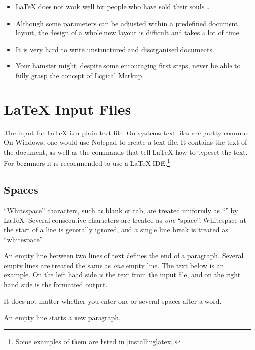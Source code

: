 \begin{itemize}
  \item \LaTeX{} does not work well for people who have sold their
        souls \ldots
  \item Although some parameters can be adjusted within a predefined
        document layout, the design of a whole new layout is difficult and
        takes a lot of time.
  \item It is very hard to write unstructured and disorganised documents.
  \item Your hamster might, despite some encouraging first steps, never be
        able to fully grasp the concept of Logical Markup.
\end{itemize}

\section{\LaTeX{} Input Files}

The input for \LaTeX{} is a plain text file. On \Unix{} systems text files are
pretty common. On Windows, one would use Notepad to create a text file. It
contains the text of the document, as well as the commands that tell \LaTeX{}
how to typeset the text. For beginners it is recommended to use a \LaTeX{}
IDE.\footnote{Some examples of them are listed in
  \autoref{installinglatex}.}

\subsection{Spaces}\label{sec:spaces}

\enquote{Whitespace} characters, such as blank or tab, are treated uniformly as
\enquote{} by \LaTeX{}. Several consecutive 
characters are treated as \emph{one} \enquote{space}. Whitespace at the start
of a line is generally ignored, and a single line break is treated as
\enquote{whitespace}.

An empty line between two lines of text defines the end of a paragraph. Several
empty lines are treated the same as \emph{one} empty line. The text below is an
example. On the left hand side is the text from the input file, and on the
right hand side is the formatted output.

\begin{example}
It does not matter whether you
enter one or several     spaces
after a word.

An empty line starts a new
paragraph.
\end{example}

